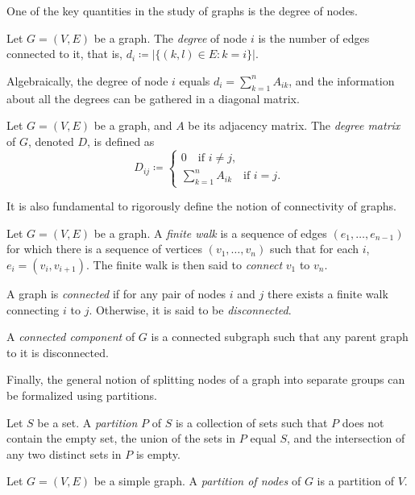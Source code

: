 \documentclass[../../main.tex]{subfiles} %
\begin{document}
One of the key quantities in the study of graphs is the degree of nodes.
\begin{definition}
	Let \(G=(V, E)\) be a graph. The \textit{degree} of node \(i\) is the 
	number 
	of edges connected to it, that is, \(d_i \coloneqq \vert \{(k, l) \in E : k = 
	i\} 
	\vert\).
\end{definition}
Algebraically, the degree of node \(i\) equals \(d_i = \sum_{k=1}^n A_{ik}\), 
and the information about all the degrees can be gathered in a diagonal 
matrix.
\begin{definition}
	Let \(G=(V, E)\) be a graph, and \(A\) be its adjacency matrix. The 
	\textit{degree matrix} of \(G\), denoted \(D\), is defined as
	\begin{equation}
		D_{ij} \coloneqq \begin{cases}
			0 \quad \text{if } i \neq j,\\
			\sum_{k=1}^n A_{ik} \quad \text{if } i = j.
		\end{cases}
	\end{equation}
\end{definition}

It is also fundamental to rigorously define the notion of connectivity of 
graphs.
\begin{definition}
	Let \(G = (V, E)\) be a graph.
	A \textit{finite walk} is a sequence of edges 
	\((e_1, \dots, e_{n-1})\) for which there is a sequence of vertices 
	\((v_1, 
	\dots, v_n)\) such that for each \(i\), \(e_i = (v_i, v_{i+1})\). The finite 
	walk is 
	then said to \textit{connect} \(v_1\) to \(v_n\). 
\end{definition}
\begin{definition}
	A graph is \textit{connected} if for any pair of nodes \(i\) and \(j\) there 
	exists a finite walk connecting \(i\) to \(j\). Otherwise, it is said to be 
	\textit{disconnected}.
\end{definition}
\begin{definition}
	A \textit{connected component} of \(G\) is a connected subgraph such 
	that 
	any parent graph to it is disconnected.
\end{definition}

Finally, the general notion of splitting nodes of a graph into separate groups 
can be formalized using partitions.
\begin{definition}
	Let \(S\) be a set. A \textit{partition} \(P\) of \(S\) is a collection of sets 
	such 
	that \(P\) does not contain the empty set, the union of the sets in \(P\) 
	equal 
	\(S\), and the intersection of any two distinct sets in \(P\) is empty.
\end{definition}
\begin{definition}
	Let \(G = (V, E)\) be a simple graph. A \textit{partition of nodes} of \(G\) 
	is 
	a partition of \(V\).
\end{definition}
\end{document}
